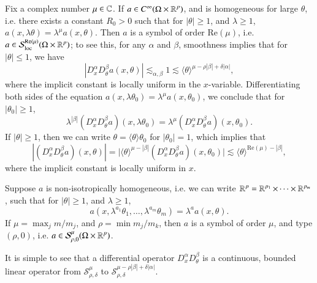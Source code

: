 \begin{example}
    Fix a complex number $\mu \in \operatorname{\mathbb{C}}$. If $a \in C^\infty(\Omega \times \operatorname{\mathbb{R}}^p)$, and is homogeneous for large $\theta$, i.e. there exists a constant $R_0 > 0$ such that for $|\theta| \geq 1$, and $\lambda \geq 1$, $a(x,\lambda \theta) = \lambda^\mu a(x, \theta)$. Then $a$ is a symbol of order $\text{Re}(\mu)$, i.e. $a \in \mathcal{S}^{\text{Re}(\mu)}_{\text{loc}}(\Omega \times \operatorname{\mathbb{R}}^p)$; to see this, for any $\alpha$ and $\beta$, smoothness implies that for $|\theta| \leq 1$, we have
    \[ |D^\alpha_x D^\beta_\theta a(x,\theta)| \lesssim_{\alpha,\beta} 1 \lesssim \langle \theta \rangle^{\mu - \rho |\beta| + \delta |\alpha|}, \]
    where the implicit constant is locally uniform in the $x$-variable. Differentiating both sides of the equation $a(x,\lambda \theta_0) = \lambda^\mu a(x,\theta_0)$, we conclude that for $|\theta_0| \geq 1$,
    \[ \lambda^{|\beta|} (D^\alpha_x D^\beta_\theta a)(x,\lambda \theta_0) = \lambda^\mu (D^\alpha_x D^\beta_\theta a)(x,\theta_0). \]
    If $|\theta| \geq 1$, then we can write $\theta = \langle \theta \rangle \theta_0$ for $|\theta_0| = 1$, which implies that
    \[ |(D^\alpha_x D^\beta_\theta a)(x, \theta)| = \Big| \langle \theta \rangle^{\mu - |\beta|} (D^\alpha_x D^\beta_\theta a)(x, \theta_0) \Big| \lesssim \langle \theta \rangle^{\text{Re}(\mu) - |\beta|}, \]
    where the implicit constant is locally uniform in $x$.
\end{example}

\begin{example}
    Suppose $a$ is non-isotropically homogeneous, i.e. we can write $\operatorname{\mathbb{R}}^p = \operatorname{\mathbb{R}}^{p_1} \times \dots \times \operatorname{\mathbb{R}}^{p_m}$, such that for $|\theta| \geq 1$, and $\lambda \geq 1$,
    \[ a(x, \lambda^{a_1} \theta_1, \dots, \lambda^{a_m} \theta_m ) = \lambda^a a(x, \theta). \]
    If $\mu = \max_j m / m_j$, and $\rho = \min m_j / m_k$, then $a$ is a symbol of order $\mu$, and type $(\rho,0)$, i.e. $a \in \mathcal{S}^\mu_{\rho,0}(\Omega \times \operatorname{\mathbb{R}}^p)$.
\end{example}

It is simple to see that a differential operator $D^\alpha_x D^\beta_\theta$ is a continuous, bounded linear operator from $\mathcal{S}^\mu_{\rho,\delta}$ to $\mathcal{S}^{\mu - \rho |\beta| + \delta |\alpha|}_{\rho,\delta}$.

